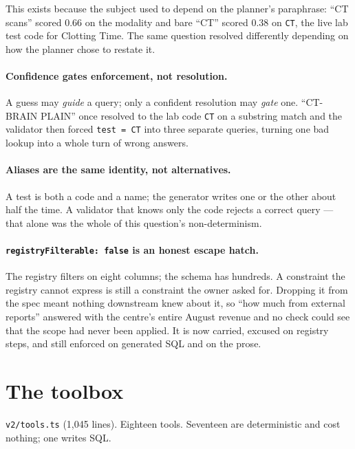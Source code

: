 \documentclass[11pt,a4paper]{report}
\newcommand{\file}[1]{\texttt{\small #1}}
\newcommand{\code}[1]{\texttt{\small #1}}
\begin{document}
\noindent This exists because the subject used to depend on the planner's paraphrase: ``CT scans''
scored 0.66 on the modality and bare ``CT'' scored 0.38 on \code{CT}, the live lab test code for
Clotting Time. The same question resolved differently depending on how the planner chose to
restate it.

\paragraph{Confidence gates enforcement, not resolution.} A guess may \emph{guide} a query; only a
confident resolution may \emph{gate} one. ``CT-BRAIN PLAIN'' once resolved to the lab code
\code{CT} on a substring match and the validator then forced \code{test = CT} into three separate
queries, turning one bad lookup into a whole turn of wrong answers.

\paragraph{Aliases are the same identity, not alternatives.} A test is both a code and a name; the
generator writes one or the other about half the time. A validator that knows only the code rejects
a correct query --- that alone was the whole of this question's non-determinism.

\paragraph{\code{registryFilterable: false} is an honest escape hatch.} The registry filters on
eight columns; the schema has hundreds. A constraint the registry cannot express is still a
constraint the owner asked for. Dropping it from the spec meant nothing downstream knew about it,
so ``how much from external reports'' answered with the centre's entire August revenue and no check
could see that the scope had never been applied. It is now carried, excused on registry steps, and
still enforced on generated SQL and on the prose.

\section{The toolbox}

\file{v2/tools.ts} (1{,}045 lines). Eighteen tools. Seventeen are deterministic and cost nothing;
one writes SQL.
\end{document}
